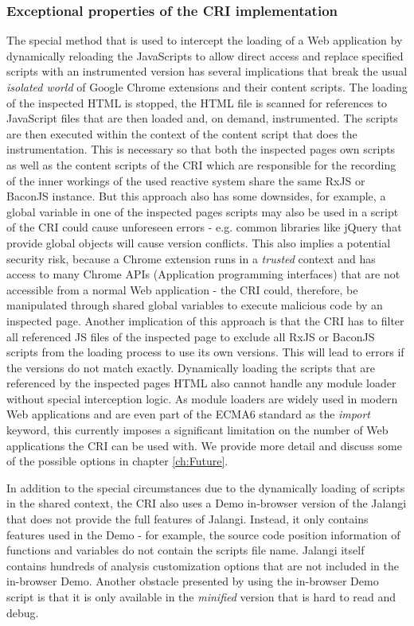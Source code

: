 	\subsubsection{Exceptional properties of the CRI implementation}
	\label{sec:CRISpecials}
	The special method that is used to intercept the loading of a Web application by dynamically reloading the JavaScripts to allow direct access and replace specified scripts with an instrumented version has several implications that break the usual \emph{isolated world} \cite{GoogleApiContentScripts} of Google Chrome extensions and their content scripts. The loading of the inspected HTML is stopped, the HTML file is scanned for references to JavaScript files that are then loaded and, on demand, instrumented. The scripts are then executed within the context of the content script that does the instrumentation. This is necessary so that both the inspected pages own scripts as well as the content scripts of the CRI which are responsible for the recording of the inner workings of the used reactive system share the same RxJS or BaconJS instance. But this approach also has some downsides, for example, a global variable in one of the inspected pages scripts may also be used in a script of the CRI could cause unforeseen errors - e.g. common libraries like jQuery \cite{jQuery} that provide global objects will cause version conflicts. This also implies a potential security risk, because a Chrome extension runs in a \emph{trusted} context and has access to many Chrome APIs (Application programming interfaces) that are not accessible from a normal Web application - the CRI could, therefore, be manipulated through shared global variables to execute malicious code by an inspected page.
	Another implication of this approach is that the CRI has to filter all referenced JS files of the inspected page to exclude all RxJS or BaconJS scripts from the loading process to use its own versions. This will lead to errors if the versions do not match exactly.
	Dynamically loading the scripts that are referenced by the inspected pages HTML also cannot handle any module loader without special interception logic. As module loaders are widely used in modern Web applications and are even part of the ECMA6 \cite{ECMA6import} standard as the \emph{import} keyword, this currently imposes a significant limitation on the number of Web applications the CRI can be used with. We provide more detail and discuss some of the possible options in chapter \ref{ch:Future}.
	
	In addition to the special circumstances due to the dynamically loading of scripts in the shared context, the CRI also uses a Demo \cite{JalangiDemo} in-browser version of the Jalangi \cite{Jalangi} that does not provide the full features of Jalangi. Instead, it only contains features used in the Demo - for example, the source code position information of functions and variables do not contain the scripts file name. Jalangi itself contains hundreds of analysis customization options that are not included in the in-browser Demo. Another obstacle presented by using the in-browser Demo script is that it is only available in the \emph{minified} version that is hard to read and debug.
	

